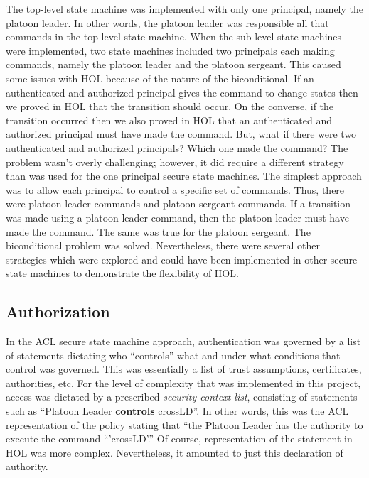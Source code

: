The top-level state machine was implemented with only one principal, namely the
platoon leader. In other words, the platoon leader was responsible all that commands
in the top-level state machine. When the sub-level state machines were implemented,
two state machines included two principals each making commands, namely the platoon
leader and the platoon sergeant. This caused some issues with HOL because of the
nature of the biconditional. If an authenticated and authorized principal gives the
command to change states then we proved in HOL that the transition should occur.
On the converse, if the transition occurred then we also proved in HOL that an
authenticated and authorized principal must have made the command. But, what if there
were two authenticated and authorized principals? Which one made the command? The
problem wasn’t overly challenging; however, it did require a different strategy than
was used for the one principal secure state machines. The simplest approach was to
allow each principal to control a specific set of commands. Thus, there were platoon
leader commands and platoon sergeant commands. If a transition was made using a platoon
leader command, then the platoon leader must have made the command. The same was true
for the platoon sergeant. The biconditional problem was solved. Nevertheless, there
were several other strategies which were explored and could have been implemented in
other secure state machines to demonstrate the flexibility of HOL.

\subsection{Authorization}
\label{sec:authorization}

In the ACL secure state machine approach, authentication was governed by a list of
statements dictating who “controls” what and under what conditions that control was
governed. This was essentially a list of trust assumptions, certificates, authorities,
etc. For the level of complexity that was implemented in this project, access was
dictated by a prescribed \textit{security context list}, consisting of statements such as
“Platoon Leader \textbf{controls} crossLD”. In other words, this was the ACL representation
of the policy stating that “the Platoon Leader has the authority to execute the
command “’crossLD’.” Of course, representation of the statement in HOL was more complex.
Nevertheless, it amounted to just this declaration of authority.\\

